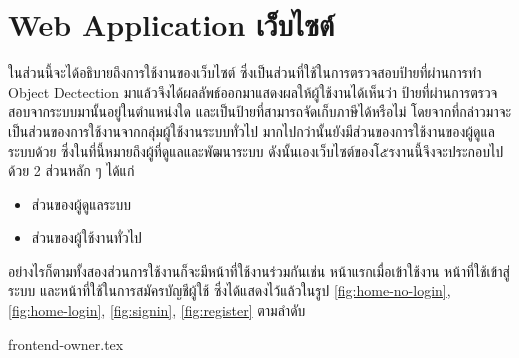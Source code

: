 \clearpage
\section{\ifenglish Web Application \else เว็บไซต์ \fi}
\ifenglish * \else
ในส่วนนี้จะได้อธิบายถึงการใช้งานของเว็บไซต์ ซึ่งเป็นส่วนที่ใช้ในการตรวจสอบป้ายที่ผ่านการทำ Object Dectection มาแล้วจึงได้ผลลัพธ์ออกมาแสดงผลให้ผู้ใช้งานได้เห็นว่า ป้ายที่ผ่านการตรวจสอบจากระบบมานั้นอยู่ในตำแหน่งใด
และเป็นป้ายที่สามารถจัดเก็บภาษีได้หรือไม่ โดยจากที่กล่าวมาจะเป็นส่วนของการใช้งานจากกลุ่มผู้ใช้งานระบบทั่วไป มากไปกว่านั้นยังมีส่วนของการใช้งานของผู้ดูแลระบบด้วย ซึ่งในที่นี้หมายถึงผู้ที่ดูแลและพัฒนาระบบ ดังนั้นเองเว็บไซต์ของโ๕รงานนี้จึงจะประกอบไปด้วย 2 ส่วนหลัก ๆ ได้แก่
\begin{itemize}
    \item ส่วนของผู้ดูแลระบบ
    \item ส่วนของผู้ใช้งานทั่วไป
\end{itemize}
\fi

อย่างไรก็ตามทั้งสองส่วนการใช้งานก็จะมีหน้าที่ใช้งานร่วมกันเช่น หน้าแรกเมื่อเข้าใช้งาน หน้าที่ใช้เข้าสู่ระบบ และหน้าที่ใช้ในการสมัครบัญชีผู้ใช้ ซึ่งได้แสดงไว้แล้วในรูป
\ref{fig:home-no-login}, \ref{fig:home-login}, \ref{fig:signin}, \ref{fig:register} ตามลำดับ



\clearpage

{frontend-owner.tex}